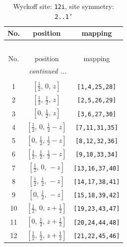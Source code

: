 \documentclass[fleqn,8pt]{jsarticle}
\begin{document}
\begin{longtable}{ccc}
\caption{Wyckoff site: {\tt 12i}, site symmetry: {\tt 2..1'}}
 \\
 \hline \hline
No. & position & mapping \\ \hline \endfirsthead

\multicolumn{2}{l}{\tablename\ \thetable{}} \\
 \hline \hline
No. & position & mapping \\ \hline \endhead

 \hline \hline
\multicolumn{2}{r}{\footnotesize\it continued ...} \\ \endfoot

 \hline \hline
\multicolumn{2}{r}{} \\ \endlastfoot

1 & $\left[ \frac{1}{2},\, 0,\, z \right]$ & {\tt [1,4,25,28]} \\ \hline
2 & $\left[ \frac{1}{2},\, \frac{1}{2},\, z \right]$ & {\tt [2,5,26,29]} \\ \hline
3 & $\left[ 0,\, \frac{1}{2},\, z \right]$ & {\tt [3,6,27,30]} \\ \hline
4 & $\left[ \frac{1}{2},\, 0,\, \frac{1}{2} - z \right]$ & {\tt [7,11,31,35]} \\ \hline
5 & $\left[ 0,\, \frac{1}{2},\, \frac{1}{2} - z \right]$ & {\tt [8,12,32,36]} \\ \hline
6 & $\left[ \frac{1}{2},\, \frac{1}{2},\, \frac{1}{2} - z \right]$ & {\tt [9,10,33,34]} \\ \hline
7 & $\left[ \frac{1}{2},\, 0,\, - z \right]$ & {\tt [13,16,37,40]} \\ \hline
8 & $\left[ \frac{1}{2},\, \frac{1}{2},\, - z \right]$ & {\tt [14,17,38,41]} \\ \hline
9 & $\left[ 0,\, \frac{1}{2},\, - z \right]$ & {\tt [15,18,39,42]} \\ \hline
10 & $\left[ \frac{1}{2},\, 0,\, z + \frac{1}{2} \right]$ & {\tt [19,23,43,47]} \\ \hline
11 & $\left[ 0,\, \frac{1}{2},\, z + \frac{1}{2} \right]$ & {\tt [20,24,44,48]} \\ \hline
12 & $\left[ \frac{1}{2},\, \frac{1}{2},\, z + \frac{1}{2} \right]$ & {\tt [21,22,45,46]} \\
\end{longtable}
\renewcommand{\arraystretch}{1.2}
\end{document}
